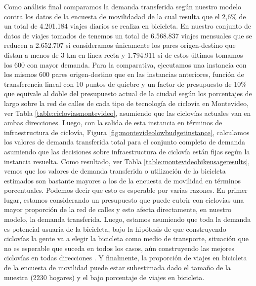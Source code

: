 Como análisis final comparamos la demanda transferida según nuestro modelo contra los datos de la encuesta de movilidadad \textcite{Mauttone2017a} de la cual resulta que el 2,6\% de un total de 4.201.184 viajes diarios se realiza en bicicleta. En nuestro conjunto de datos de viajes tomados de \textcite{Massobrio2020} tenemos un total de 6.568.837 viajes mensuales que se reducen a 2.652.707 si consideramos únicamente los pares origen-destino que distan a menos de 3 km en línea recta y 1.794.911 si de estos últimos tomamos los 600 con mayor demanda. Para la comparativa, ejecutamos una instancia con los mismos 600 pares origen-destino que en las instancias anteriores, función de transferencia lineal con 10 puntos de quiebre y un factor de presupuesto de 10\% que equivale al doble del presupuesto actual de la ciudad según los porcentajes de largo sobre la red de calles de cada tipo de tecnología de ciclovía en Montevideo, ver Tabla \ref{table:cicloviasmontevideo}, asumiendo que las ciclovías actuales van en ambas direcciones. Luego, con la salida de esta instancia en términos de infraestructura de ciclovía, Figura \ref{fig:montevideolowbudgetinstance}, calculamos los valores de demanda transferida total para el conjunto completo de demanda asumiendo que las decisiones sobre infraestructura de ciclovía están fijas según la instancia resuelta. Como resultado, ver Tabla \ref{table:montevideobikeusageresults}, vemos que los valores de demanda transferida o utilización de la bicicleta estimados son bastante mayores a los de la encuesta de movilidad en términos porcentuales. Podemos decir que esto es esperable por varias razones. En primer lugar, estamos considerando un presupuesto que puede cubrir con ciclovías una mayor proporción de la red de calles y esto afecta directamente, en nuestro modelo, la demanda transferida. Luego, estamos asumiendo que toda la demanda es potencial usuaria de la bicicleta, bajo la hipótesis de que construyendo ciclovías la gente va a elegir la bicicleta como medio de transporte, situación que no es esperable que suceda en todos los casos, aún construyendo las mejores ciclovías en todas direcciones \parencite{shwe2014}. Y finalmente, la proporción de viajes en bicicleta de la encuesta de movilidad puede estar subestimada dado el tamaño de la muestra (2230 hogares) y el bajo porcentaje de viajes en bicicleta.

